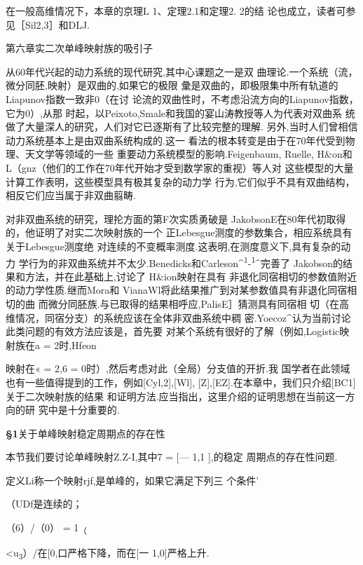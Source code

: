 \documentclass{article}
\begin{document}
在一般高维情况下，本章的京理L 1、定理2.1和定理2. 2的结
论也成立，读者可参见［Sil2,3］和DLJ.

\protect\hypertarget{bookmark348}{}{}第六章实二次单峰映射族的吸引子

从60年代兴起的动力系统的现代研究,其中心课题之一是双
曲理论.一个系统（流，微分同胚,映射）是双曲的,如果它的极限
彙是双曲的，即极限集中所有轨道的Liapunov指数一致非0（在讨
论流的双曲性时，不考虑沿流方向的Liapunov指数，它为0）,从那
时起，以Peixoto,Smale和我国的宴山涛教授等人为代表对双曲系
统做了大量深人的研究，人们对它已逐斯有了比较完整的理解.
另外,当时人们曾相信动力系统基本上是由双曲系统构成的.这一
看法的根本转变是由于在70年代受到物理、天文学等领域的一些
重要动力系统模型的影响.Feigenbaum, Ruelle, H\&on和
L（gnz（他们的工作在70年代开始才受到数学家的重视）等人对
这些模型的大量计算工作表明，这些模型具有极其复杂的动力学
行为,它们似乎不具有双曲结构，相反它们应当属于非双曲翦畴.

对非双曲系统的研究，理抡方面的第F次实质勇破是
JakobsonE在80年代初取得的，他证明了对实二次映射族的一个
正Lebesgue测度的参数集合，相应系统具有关于Lebesgue测度绝
对连续的不变概率测度.这表明,在测度意义下,具有复杂的动力
学行为的非双曲系统并不太少.Benedicks和Carleson\^{}\textsuperscript{1}-\textsuperscript{1}\^{}完善了
Jakobson的结果和方法，并在此基础上,讨论了 H\&ion映射在具有
非退化同宿相切的参数值附近的动力学性质.继而Mora和
VianaWl将此结果推广到对某参数值具有非退化同宿相切的曲
而微分同胚族.与已取得的结果相呼应,PalisE］猜测具有同宿相
切（在高维情况，同宿分支）的系统应该在全体非双曲系统中稠
密.Yoecoz\^{}认为当前讨论此类问题的有效方法应该是，首先要
对某个系统有很好的了解（例如,Logistic映射族在a = 2时,Hfeon

映射在« = 2,6 = 0时）,然后考虑对此（全局）分支值的开折.我
国学者在此领域也有一些值得提到的工作，例如{[}Cyl,2{]},{[}Wl{]},
{[}Z{]},{[}EZ{]}.在本章中，我们只介绍{[}BC1{]}关于二次映射族的结果
和证明方法.应当指出，这里介绍的证明思想在当前这一方向的研
究中是十分重要的.

\protect\hypertarget{bookmark351}{}{}\textbf{§1}关于单峰映射稳定周期点的存在性

本节我们要讨论单峰映射Z.Z-I,其中7 = {[}--- 1,1 {]},的稳定
周期点的存在性问题.

定义Li称一个映射rjf,是单峰的，如果它满足下列三 个条件'

（UDf是连续的；

（6）/（0） = 1\textsubscript{（}

\textless{}u\textsubscript{3}）/在{[}0,口严格下降，而在{[}一
1,0{]}严格上升.
\end{document}
